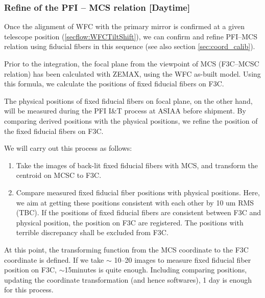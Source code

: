 \subsubsection{Refine of the PFI -- MCS relation [Daytime]}\label{secflow:mcs2f3c}
Once the alignment of WFC with the primary mirror is confirmed at a given telescope position (\ref{secflow:WFCTiltShift}), we can confirm and refine PFI--MCS relation using fiducial fibers in this sequence (see also section \ref{sec:coord_calib}).

Prior to the integration, the focal plane from the viewpoint of MCS (F3C--MCSC relation) has been calculated with ZEMAX, using the WFC as-built model.
Using this formula, we calculate the positions of fixed fiducial fibers on F3C.

The physical positions of fixed fiducial fibers on focal plane, on the other hand, will be measured during the PFI I\&T process at ASIAA before shipment.
By comparing derived positions with the physical positions, we refine the position of the fixed fiducial fibers on F3C.

We will carry out this process as follows:
\begin{enumerate}
\item Take the images of back-lit fixed fiducial fibers with MCS, and transform the centroid on MCSC to F3C.
\item Compare measured fixed fiducial fiber positions with physical positions.
Here, we aim at getting these positions consistent with each other by 10 um RMS (TBC).
If the positions of fixed fiducial fibers are consistent between F3C and physical position, the position on F3C are registered.
The positions with terrible discrepancy shall be excluded from F3C.
\end{enumerate}

At this point, the transforming function from the MCS coordinate to the F3C coordinate is defined.
If we take $\sim$ 10--20 images to measure fixed fiducial fiber position on F3C, $\sim$15minutes  is quite enough. 
Including comparing positions, updating the coordinate transformation (and hence softwares), 1 day is enough for this process.

